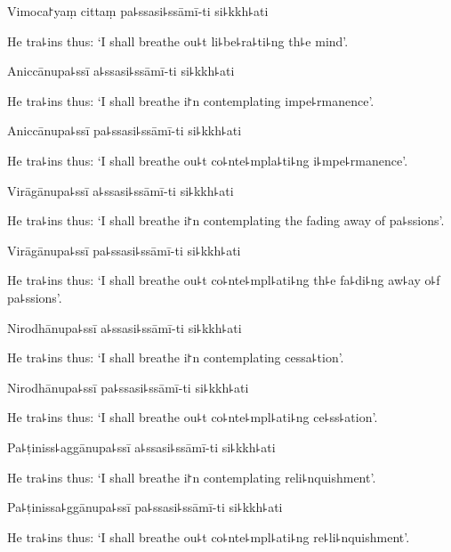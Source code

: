 Vimoca꜓yaṃ cittaṃ pa꜕ssasi꜕ssāmī-ti si꜕kkh꜕ati

\begin{english}
  He tra꜕ins thus: `I shall breathe ou꜕t li꜕be꜕ra꜕ti꜕ng th꜕e mind'.
\end{english}

Aniccānupa꜕ssī a꜕ssasi꜕ssāmī-ti si꜕kkh꜕ati

\begin{english}
  He tra꜕ins thus: `I shall breathe i꜓n contemplating impe꜕rmanence'.
\end{english}

Aniccānupa꜕ssī pa꜕ssasi꜕ssāmī-ti si꜕kkh꜕ati

\begin{english}
  He tra꜕ins thus: `I shall breathe ou꜕t co꜕nte꜕mpla꜕ti꜕ng i꜕mpe꜕rmanence'.
\end{english}

Virāgānupa꜕ssī a꜕ssasi꜕ssāmī-ti si꜕kkh꜕ati

\begin{english}
  He tra꜕ins thus: `I shall breathe i꜓n contemplating the fading away of pa꜕ssions'.
\end{english}

Virāgānupa꜕ssī pa꜕ssasi꜕ssāmī-ti si꜕kkh꜕ati

\begin{english}
  He tra꜕ins thus: `I shall breathe ou꜕t co꜕nte꜕mpl꜕ati꜕ng th꜕e fa꜕di꜕ng aw꜕ay o꜕f pa꜕ssions'.
\end{english}

Nirodhānupa꜕ssī a꜕ssasi꜕ssāmī-ti si꜕kkh꜕ati

\begin{english}
  He tra꜕ins thus: `I shall breathe i꜓n contemplating cessa꜕tion'.
\end{english}

Nirodhānupa꜕ssī pa꜕ssasi꜕ssāmī-ti si꜕kkh꜕ati

\begin{english}
  He tra꜕ins thus: `I shall breathe ou꜕t co꜕nte꜕mpl꜕ati꜕ng ce꜕ss꜕ation'.
\end{english}

Pa꜕ṭiniss꜕aggānupa꜕ssī a꜕ssasi꜕ssāmī-ti si꜕kkh꜕ati

\begin{english}
  He tra꜕ins thus: `I shall breathe i꜓n contemplating reli꜕nquishment'.
\end{english}

Pa꜕ṭinissa꜕ggānupa꜕ssī pa꜕ssasi꜕ssāmī-ti si꜕kkh꜕ati

\begin{english}
  He tra꜕ins thus: `I shall breathe ou꜕t co꜕nte꜕mpl꜕ati꜕ng re꜕li꜕nquishment'.
\end{english}

